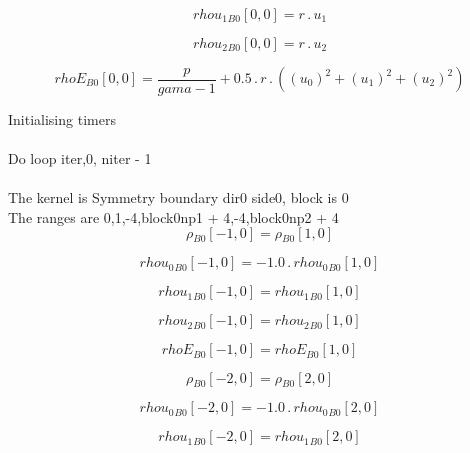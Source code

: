 \documentclass{article}
\begin{document}
\begin{dmath}{rhou_{1}{_{B0}}}[{0,0}] = r \,.\, u_{1}\end{dmath}

\begin{dmath}{rhou_{2}{_{B0}}}[{0,0}] = r \,.\, u_{2}\end{dmath}

\begin{dmath}{rhoE{_{B0}}}[{0,0}] = \frac{p}{gama - 1} + 0.5 \,.\, r \,.\, \left(\left(u_{0} \right)^{2} + \left(u_{1} \right)^{2} + \left(u_{2} \right)^{2}\right)\end{dmath}

\noindent Initialising timers\\
\\\noindent Do loop iter,0, niter - 1\\
\\\noindent The kernel is Symmetry boundary dir0 side0, block is 0\\\noindent The ranges are 0,1,-4,block0np1 + 4,-4,block0np2 + 4\\\begin{dmath}{\rho{_{B0}}}[{-1,0}] = {\rho{_{B0}}}[{1,0}]\end{dmath}

\begin{dmath}{rhou_{0}{_{B0}}}[{-1,0}] = - 1.0 \,.\, {rhou_{0}{_{B0}}}[{1,0}]\end{dmath}

\begin{dmath}{rhou_{1}{_{B0}}}[{-1,0}] = {rhou_{1}{_{B0}}}[{1,0}]\end{dmath}

\begin{dmath}{rhou_{2}{_{B0}}}[{-1,0}] = {rhou_{2}{_{B0}}}[{1,0}]\end{dmath}

\begin{dmath}{rhoE{_{B0}}}[{-1,0}] = {rhoE{_{B0}}}[{1,0}]\end{dmath}

\begin{dmath}{\rho{_{B0}}}[{-2,0}] = {\rho{_{B0}}}[{2,0}]\end{dmath}

\begin{dmath}{rhou_{0}{_{B0}}}[{-2,0}] = - 1.0 \,.\, {rhou_{0}{_{B0}}}[{2,0}]\end{dmath}

\begin{dmath}{rhou_{1}{_{B0}}}[{-2,0}] = {rhou_{1}{_{B0}}}[{2,0}]\end{dmath}
\end{document}

